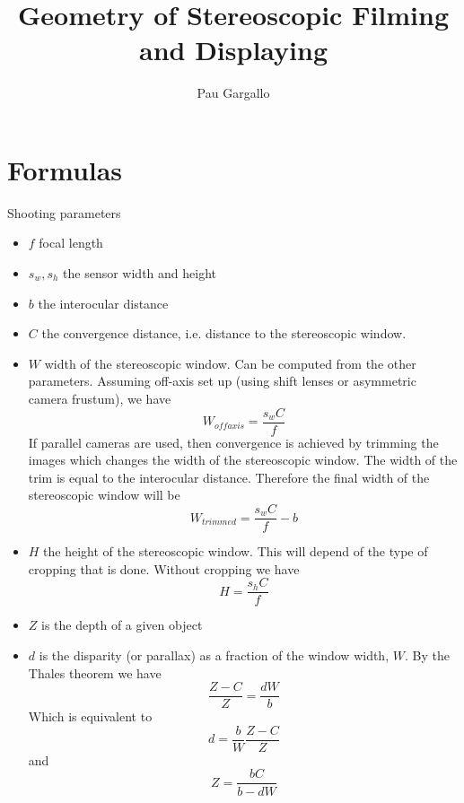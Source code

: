 \documentclass[12pt,a4paper]{article}
\begin{document}
\title{Geometry of Stereoscopic Filming and Displaying}
\author{Pau Gargallo}
\maketitle

\section{Formulas}
Shooting parameters
\begin{itemize}
 \item $f$ focal length
 \item $s_w, s_h$ the sensor width and height
 \item $b$ the interocular distance
 \item $C$ the convergence distance, i.e. distance to the stereoscopic window.
 \item $W$ width of the stereoscopic window. Can be computed from the other parameters. Assuming off-axis set up (using shift lenses or asymmetric camera frustum), we have
 \begin{equation}
  W_{offaxis} = \frac{s_w C}{f}
 \end{equation}
 If parallel cameras are used, then convergence is achieved by trimming the images which changes the width of the stereoscopic window. The width of the trim is equal to the interocular distance. Therefore the final width of the stereoscopic window will be
 \begin{equation}
  W_{trimmed} = \frac{s_w C}{f} - b
 \end{equation}
 \item $H$ the height of the stereoscopic window. This will depend of the type of cropping that is done. Without cropping we have
\begin{equation}
  H = \frac{s_h C}{f}
 \end{equation} 
 \item $Z$ is the depth of a given object
 \item $d$ is the disparity (or parallax) as a fraction of the window width, $W$.  By the Thales theorem we have
 \begin{equation}
  \frac{Z - C}{Z} = \frac{dW}{b}
 \end{equation}
 Which is equivalent to
 \begin{equation}\label{eqn:disparity}
  d = \frac{b}{W} \frac{Z-C}{Z}
 \end{equation}
 and
 \begin{equation}
  Z = \frac{bC}{b - dW}
 \end{equation} 
\end{itemize}
\end{document}
